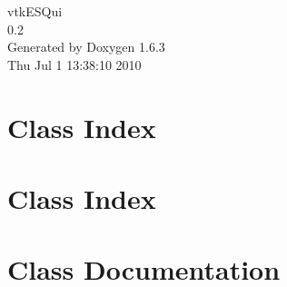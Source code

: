 \documentclass[a4paper]{book}
\begin{document}
\hypersetup{pageanchor=false}
\begin{titlepage}
\vspace*{7cm}
\begin{center}
{\Large vtkESQui \\[1ex]\large 0.2 }\\
\vspace*{1cm}
{\large Generated by Doxygen 1.6.3}\\
\vspace*{0.5cm}
{\small Thu Jul 1 13:38:10 2010}\\
\end{center}
\end{titlepage}
\clearemptydoublepage
{}
\tableofcontents
\clearemptydoublepage
{}
\hypersetup{pageanchor=true}
\chapter{Class Index}

\chapter{Class Index}

\chapter{Class Documentation}















































\printindex
\end{document}
